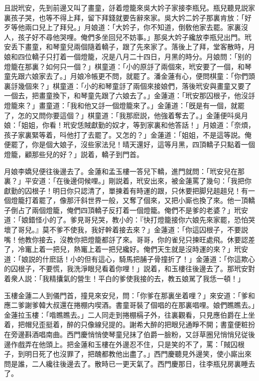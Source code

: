 且説玳安，先到前邊又叫了畫童，㧱着燈籠來吳大妗子家接李瓶兒。瓶兒聽見説家裏孩子哭，也等不得上拜，留下拜錢就要告辭來家。吳大妗二妗子那裏肯放：「好歹等他兩口兒上了拜兒。」月娘道：「大妗子，你不知道，倒敎他家去罷。家裏沒人，孩子好不尋他哭哩。俺們多坐回兒不妨事。」那吳大妗子纔放李瓶兒出門。玳安丢下畫童，和琴童兒兩個隨着轎子，跟了先來家了。落後上了拜，堂客散時，月娘和四位轎子只打着一個燈籠，况是八月二十四日，月黑的時分。月娘問：「别的燈籠在那裏？如何只一個？」棋童道：「小的原㧱了兩個來，玳安要了一個，和琴童先跟六娘家去了。」月娘冷帳更不問，就罷了。潘金蓮有心，便問棋童：「你們頭裏㧱幾個來？」棋童道：「小的和琴童㧱了兩個來接娘們，落後玳安與畫童又要了一個去，把畫童換下，和琴童先跟了六娘去了。」金蓮道：「玳安那囚根子，他沒㧱燈籠來？」畫童道：「我和他又㧱一個燈籠來了。」金蓮道：「旣是有一個，就罷了，怎的又問你要這個？」棋童道：「我那麽説，他強着奪去了。」金蓮便呌吳月娘：「姐姐，你看！玳安恁賊獻勤的奴才，等到家裏和他答話！」月娘道：「奈煩，孩子家裏緊等着，呌他打了去罷了。又怎的？」金蓮道：「姐姐，不是這等説。俺便罷了，你是個大娘子，沒些家法兒！晴天還好，這等月黑，四頂轎子只點着一個燈籠，顧那些兒的好？」説着，轎子到門首。

月娘李嬌兒便往後邊去了。金蓮和孟玉樓一答兒下轎，進門就問：「玳安兒在那裏？」平安道：「在後邊伺候哩。」剛説着，玳安出來，被金蓮罵了幾句：「我把你獻勤的囚根子！明日你只認清了，單揀着有時運的跟，只休要把脚兒趄趄兒！有一個燈籠打着罷了，像那汗斜世界一般，又奪了個來，又把小廝也換了來。他一頂轎子倒占了兩個燈籠，俺們四頂轎子反打着一個燈籠。俺們不是爹的老婆？」玳安道：「娘錯怪小的了。爹見哥兒哭，教小的：『快打燈籠接你六娘先來家罷，恐怕哭壞了哥兒。』莫不爹不使我，我好幹着接去來？」金蓮道：「你這囚根子，不要説嘴！他教你接去，沒教你把燈籠都㧱了來。哥哥，你的雀兒只揀旺處飛。休要認差了，冷竃上着一把兒，熱竃上着一把兒纔好。俺們天生就是沒時運的來？」玳安道：「娘説的什麽話！小的但有這心，騎馬把脯子骨撞折了！」金蓮道：「你這欺心的囚根子，不要慌，我洗淨眼兒看着你哩！」説着，和玉樓往後邊去了。那玳安對着衆人説：「我精攮氣的營生！平白的爹使我接的去，教五娘駡了我恁一頓！」

玉樓金蓮二人到儀門首，撞見來安兒，問：「你爹在那裏坐着哩？」來安道：「爹和應二爹謝爹韓大叔還在捲棚内喫酒。書童哥裝了個唱的在那裏唱哩。娘們瞧瞧去。」金蓮拉玉樓：「喒瞧瞧去。」二人同走到捲棚槅子外，往裏觀看，只見應伯爵在上坐着，把帽兒歪挺着，醉的只像線兒提的。謝希大醉的把眼兒通睜不開；書童便粧扮在旁邊斟酒唱南曲。西門慶悄悄使琴童兒抹了伯爵一臉粉，又㧱草圈兒悄悄兒従後邊作戲弄在他頭上。把金蓮和玉樓在外邊忍不住，只是笑的不了，罵：「賊囚根子，到明日死了也沒罪了，把醜都教他出盡了。」西門慶聽見外邊笑，使小廝出來問是誰，二人纔往後邊去了。散時已一更天氣了。西門慶那日，往李瓶兒房裏睡去了。

